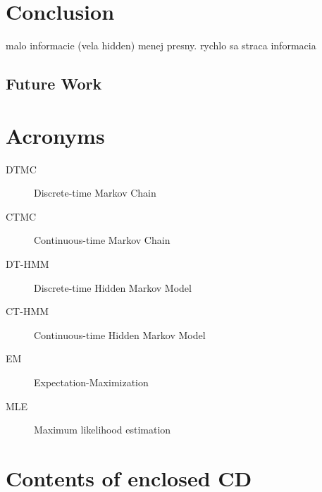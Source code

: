 \documentclass[thesis=M,english]{FITthesis}[2012/10/20]
\begin{document}






\chapter{Conclusion}

malo informacie (vela hidden) menej presny.
rychlo sa straca informacia 

\section{Future Work}





\appendix

\chapter{Acronyms}
\begin{description}
	\item[DTMC] Discrete-time Markov Chain	
	\item[CTMC] Continuous-time Markov Chain
	\item[DT-HMM] Discrete-time Hidden Markov Model
	\item[CT-HMM] Continuous-time Hidden Markov Model
	\item[EM] Expectation-Maximization 
	\item[MLE] Maximum likelihood estimation
\end{description}


\chapter{Contents of enclosed CD}


\begin{figure}
\end{figure}
\end{document}
